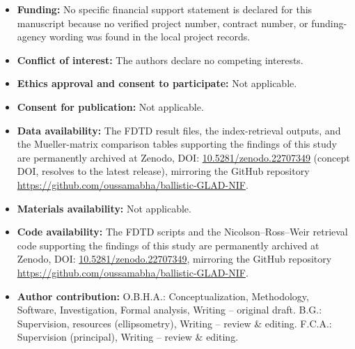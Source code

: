 \documentclass[aip,jcp,amsmath,amssymb,reprint]{revtex4-1}
\begin{document}
\begin{itemize}
\item \textbf{Funding:} No specific financial support statement is declared
  for this manuscript because no verified project number, contract number, or
  funding-agency wording was found in the local project records.
\item \textbf{Conflict of interest:} The authors declare no competing interests.
\item \textbf{Ethics approval and consent to participate:} Not applicable.
\item \textbf{Consent for publication:} Not applicable.
\item \textbf{Data availability:} The FDTD result files, the index-retrieval
  outputs, and the Mueller-matrix comparison tables supporting the findings
  of this study are permanently archived at Zenodo,
  DOI: \href{https://doi.org/10.5281/zenodo.22707349}{10.5281/zenodo.22707349}
  (concept DOI, resolves to the latest release), mirroring the GitHub
  repository \url{https://github.com/oussamabha/ballistic-GLAD-NIF}.
\item \textbf{Materials availability:} Not applicable.
\item \textbf{Code availability:} The FDTD scripts and the Nicolson--Ross--Weir
  retrieval code supporting the findings of this study are permanently
  archived at Zenodo,
  DOI: \href{https://doi.org/10.5281/zenodo.22707349}{10.5281/zenodo.22707349},
  mirroring the GitHub repository \url{https://github.com/oussamabha/ballistic-GLAD-NIF}.
\item \textbf{Author contribution:} O.B.H.A.: Conceptualization, Methodology,
  Software, Investigation, Formal analysis, Writing -- original draft. B.G.:
  Supervision, resources (ellipsometry), Writing -- review \& editing. F.C.A.:
  Supervision (principal), Writing -- review \& editing.
\end{itemize}



\end{document}
